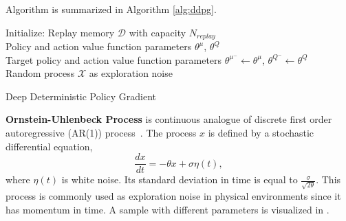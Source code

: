 Algorithm is summarized in Algorithm \ref{alg:ddpg}. 
\begin{algorithm}
	\SetAlgoLined
	\DontPrintSemicolon %
	Initialize: Replay memory $\mathcal{D}$ with capacity $N_{replay}$ \\
	Policy and action value function parameters $\theta^{\mu}$, $\theta^Q$ \\
	Target policy and action value function parameters $\theta^{\mu^-} \leftarrow \theta^{\mu}$, $\theta^{Q^-} \leftarrow \theta^{Q}$ \\
	Random process $\mathcal{X}$ as exploration noise\\
	\caption{Deep Deterministic Policy Gradient}
	\label{alg:ddpg}
\end{algorithm}

\textbf{Ornstein-Uhlenbeck Process} is continuous analogue of discrete first order autoregressive (AR(1)) process~\cite{uhlenbeck_theory_1930}. 
The process $x$ is defined by a stochastic differential equation,
\begin{equation}
\label{eqn:ou_process}
\frac{dx}{dt} = -\theta x + \sigma \eta(t),
\end{equation}
where $\eta(t)$ is white noise. 
Its standard deviation in time is equal to $\frac{\sigma}{\sqrt{2\theta}}$. 
This process is commonly used as exploration noise in physical environments since it has momentum in time. 
A sample with different parameters is visualized in .

